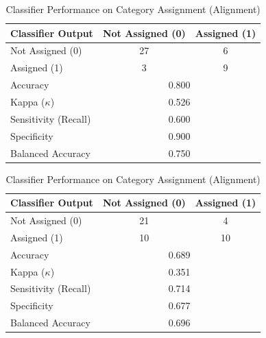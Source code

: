 \begin{table}[h!]
\begin{minipage}{0.48\textwidth}
\centering
\caption{Classifier Performance on Category Assignment (Transparency \& Accountability)}
\label{tab:cm-transparency-accountability}
\begin{tabular}{lcc}
\hline
\textbf{Classifier Output} & \textbf{Not Assigned (0)} & \textbf{Assigned (1)} \\
\hline
Not Assigned (0) & 27 & 6 \\
Assigned (1) & 3 & 9 \\
\hline
Accuracy & \multicolumn{2}{c}{0.800} \\
Kappa ($\kappa$) & \multicolumn{2}{c}{0.526} \\
Sensitivity (Recall) & \multicolumn{2}{c}{0.600} \\
Specificity & \multicolumn{2}{c}{0.900} \\
Balanced Accuracy & \multicolumn{2}{c}{0.750} \\
\hline
\end{tabular}
\end{minipage}
\hfill
\hfill
\begin{minipage}{0.48\textwidth}
\centering
\caption{Classifier Performance on Category Assignment (Alignment)}
\label{tab:cm-alignment}
\begin{tabular}{lcc}
\hline
\textbf{Classifier Output} & \textbf{Not Assigned (0)} & \textbf{Assigned (1)} \\
\hline
Not Assigned (0) & 21 & 4 \\
Assigned (1) & 10 & 10 \\
\hline
Accuracy & \multicolumn{2}{c}{0.689} \\
Kappa ($\kappa$) & \multicolumn{2}{c}{0.351} \\
Sensitivity (Recall) & \multicolumn{2}{c}{0.714} \\
Specificity & \multicolumn{2}{c}{0.677} \\
Balanced Accuracy & \multicolumn{2}{c}{0.696} \\
\hline
\end{tabular}
\end{minipage}
\end{table}


